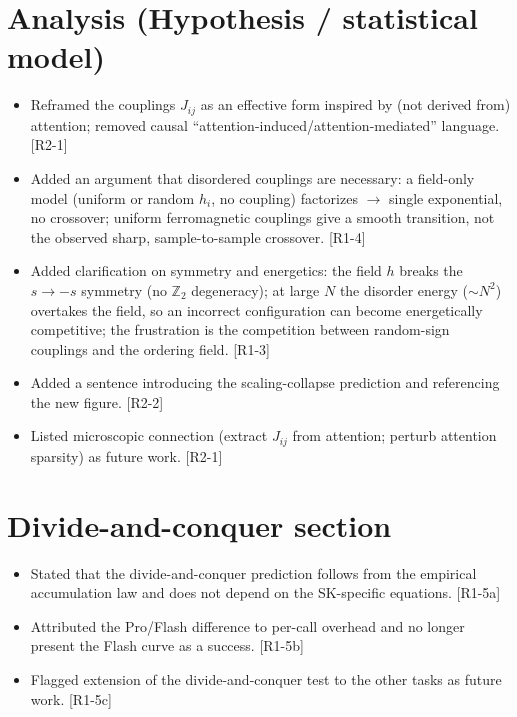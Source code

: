 \documentclass[11pt]{article}
\newcommand{\rf}[1]{\hfill\textnormal{\small[#1]}}
\begin{document}
\section{Analysis (Hypothesis / statistical model)}
\begin{itemize}
  \item Reframed the couplings $J_{ij}$ as an effective form inspired by (not derived from)
        attention; removed causal ``attention-induced/attention-mediated'' language. \rf{R2-1}
  \item Added an argument that disordered couplings are necessary: a field-only model (uniform or
        random $h_i$, no coupling) factorizes $\rightarrow$ single exponential, no crossover;
        uniform ferromagnetic couplings give a smooth transition, not the observed sharp,
        sample-to-sample crossover. \rf{R1-4}
  \item Added clarification on symmetry and energetics: the field $h$ breaks the $s\to-s$
        symmetry (no $\mathbb{Z}_2$ degeneracy); at large $N$ the disorder energy ($\sim N^2$)
        overtakes the field, so an incorrect configuration can become energetically competitive;
        the frustration is the competition between random-sign couplings and the ordering field.
        \rf{R1-3}
  \item Added a sentence introducing the scaling-collapse prediction and referencing the new
        figure. \rf{R2-2}
  \item Listed microscopic connection (extract $J_{ij}$ from attention; perturb attention
        sparsity) as future work. \rf{R2-1}
\end{itemize}

\section{Divide-and-conquer section}
\begin{itemize}
  \item Stated that the divide-and-conquer prediction follows from the empirical accumulation law
        and does not depend on the SK-specific equations. \rf{R1-5a}
  \item Attributed the Pro/Flash difference to per-call overhead and no longer present the Flash
        curve as a success. \rf{R1-5b}
  \item Flagged extension of the divide-and-conquer test to the other tasks as future work.
        \rf{R1-5c}
\end{itemize}
\end{document}
